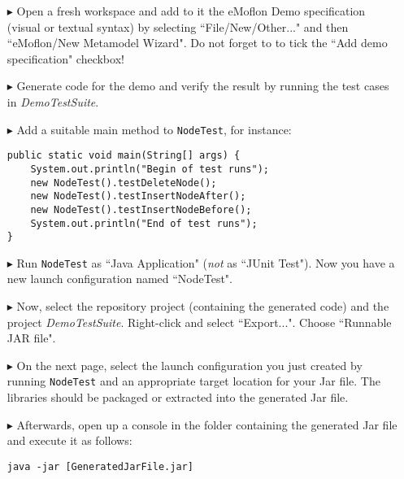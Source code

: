 \begin{itemize}
    
\item[$\blacktriangleright$] 
Open a fresh workspace and add to it the eMoflon Demo specification (visual or textual syntax) by selecting ``File/New/Other..." and then ``eMoflon/New Metamodel Wizard".
Do not forget to to tick the ``Add demo specification" checkbox!
    
\item[$\blacktriangleright$]
Generate code for the demo and verify the result by running the test cases in \emph{DemoTestSuite}.

\item[$\blacktriangleright$]
Add a suitable main method to \texttt{NodeTest}, for instance:
\begin{lstlisting}
public static void main(String[] args) {
    System.out.println("Begin of test runs");
    new NodeTest().testDeleteNode();
    new NodeTest().testInsertNodeAfter();
    new NodeTest().testInsertNodeBefore();
    System.out.println("End of test runs");
}
\end{lstlisting}

\item[$\blacktriangleright$]
Run \texttt{NodeTest} as ``Java Application" (\emph{not} as ``JUnit Test").
Now you have a new launch configuration named ``NodeTest".

\item[$\blacktriangleright$]
Now, select the repository project (containing the generated code) and the project \emph{DemoTestSuite}.
Right-click and select ``Export...".
Choose ``Runnable JAR file".
  
\item[$\blacktriangleright$]
On the next page, select the launch configuration you just created by running \texttt{NodeTest} and an appropriate target location for your Jar file.
The libraries should be packaged or extracted into the generated Jar file.

\item[$\blacktriangleright$]
Afterwards, open up a console in the folder containing the generated Jar file and execute it as follows:
\begin{lstlisting}
java -jar [GeneratedJarFile.jar]
\end{lstlisting}

    
\end{itemize}

